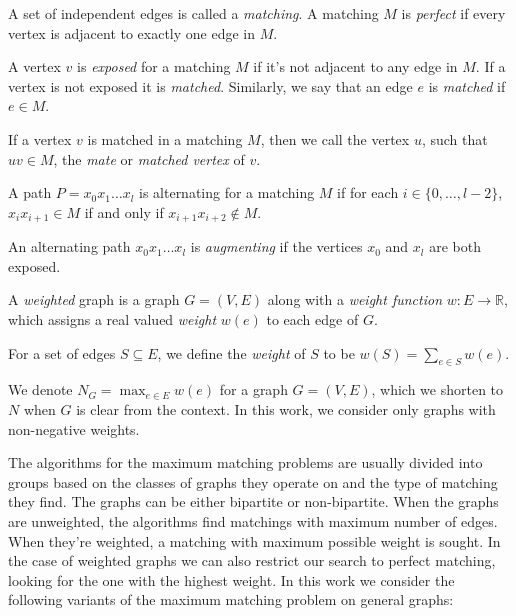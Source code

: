 \begin{defn}[matching]
    A set of independent edges is called a \emph{matching}. A matching $M$ is \emph{perfect} if every vertex is adjacent to exactly one edge in $M$.
\end{defn}

\begin{defn}
    A vertex $v$ is \emph{exposed} for a matching $M$ if it's not adjacent to any edge in $M$. If a vertex is not exposed it is \emph{matched}. Similarly, we say that an edge $e$ is \emph{matched} if $e \in M$.
\end{defn}

If a vertex $v$ is matched in a matching $M$, then we call the vertex $u$, such that $uv \in M$, the \emph{mate} or \emph{matched vertex} of $v$.

\begin{defn}
    A path $P = x_0x_1\dots x_l$ is alternating for a matching $M$ if for each $i \in \{0, \dots, l - 2\}$, $x_i x_{i+1} \in M$ if and only if $x_{i+1}x_{i+2} \notin M$.
\end{defn}

\begin{defn}
    An alternating path $x_0x_1\dots x_l$ is \emph{augmenting} if the vertices $x_0$ and $x_l$ are both exposed.
\end{defn}

\begin{defn}
    A \emph{weighted} graph is a graph $G = (V, E)$ along with a \emph{weight function} $w : E \rightarrow \mathbb{R}$, which assigns a real valued \emph{weight} $w(e)$ to each edge of $G$.
\end{defn}

For a set of edges $S \subseteq E$, we define the \emph{weight} of $S$ to be $w(S) = \sum_{e \in S} w(e)$. 

We denote $N_G = \max_{e \in E} w(e)$ for a graph $G = (V, E)$, which we shorten to $N$ when $G$ is clear from the context. In this work, we consider only graphs with non-negative weights.

The algorithms for the maximum matching problems are usually divided into groups based on the classes of graphs they operate on and the type of matching they find. The graphs can be either bipartite or non-bipartite. When the graphs are unweighted, the algorithms find matchings with maximum number of edges. When they're weighted, a matching with maximum possible weight is sought. In the case of weighted graphs we can also restrict our search to perfect matching, looking for the one with the highest weight. In this work we consider the following variants of the maximum matching problem on general graphs:

